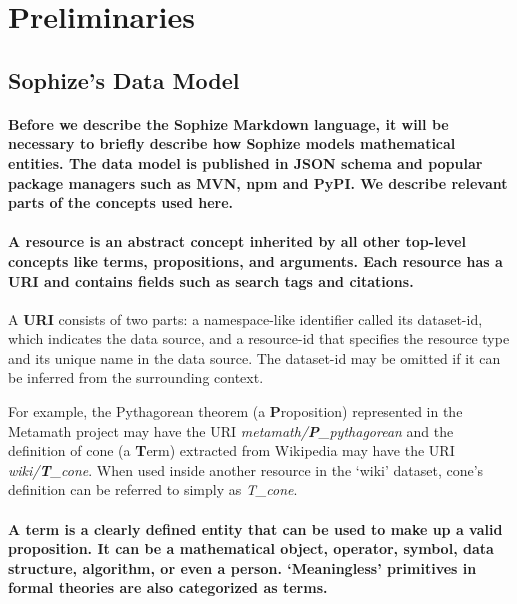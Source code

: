 \documentclass[a4paper]{article}
\begin{document}
\section{Preliminaries}

\subsection{Sophize's Data Model}
\paragraph{Before we describe the Sophize Markdown language, it will be necessary to briefly describe how Sophize models mathematical entities. The data model is published in JSON schema \cite{sophize_datamodel} and popular package managers such as MVN, npm and PyPI. We describe relevant parts of the concepts used here.}

\paragraph{A \textbf{resource} is an abstract concept inherited by all other top-level concepts like terms, propositions, and arguments. Each resource has a URI and contains fields such as search tags and citations.}

A \textbf{URI} consists of two parts: a namespace-like identifier called its dataset-id, which indicates the data source, and a resource-id that specifies the resource type and its unique name in the data source. The dataset-id may be omitted if it can be inferred from the surrounding context.

For example, the Pythagorean theorem (a \textbf{P}roposition) represented in the Metamath project may have the URI \emph{metamath/\textbf{P}\_pythagorean} and the definition of cone (a \textbf{T}erm) extracted from Wikipedia may have the URI \emph{wiki/\textbf{T}\_cone}. When used inside another resource in the `wiki' dataset, cone's definition can be referred to simply as \emph{T\_cone}.

\paragraph{A \textbf{term} is a clearly defined entity that can be used to make up a valid proposition. It can be a mathematical object, operator, symbol, data structure, algorithm, or even a person. `Meaningless' primitives in formal theories are also categorized as terms.}
\end{document}

